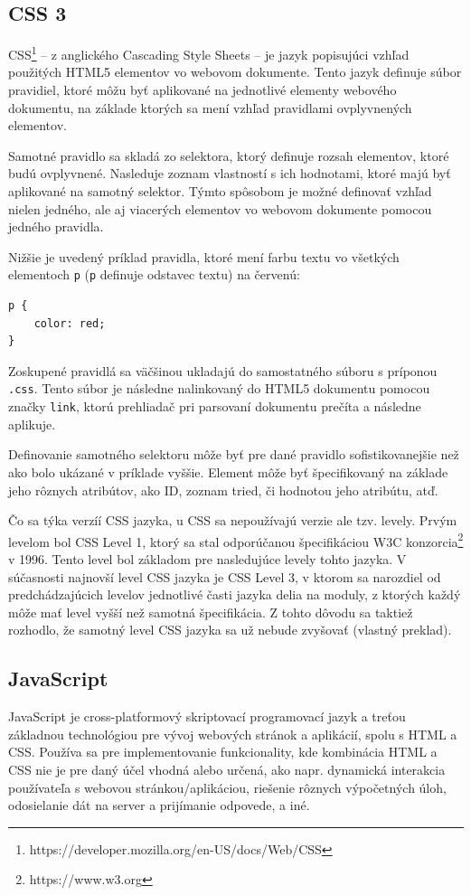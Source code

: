 \subsection {CSS 3}
CSS\footnote{https://developer.mozilla.org/en-US/docs/Web/CSS} -- z anglického Cascading Style Sheets -- je jazyk popisujúci vzhľad použitých HTML5 elementov vo webovom dokumente. Tento jazyk definuje súbor pravidiel, ktoré môžu byť aplikované na jednotlivé elementy webového dokumentu, na základe ktorých sa mení vzhľad pravidlami ovplyvnených elementov.

Samotné pravidlo sa skladá zo selektora, ktorý definuje rozsah elementov, ktoré budú ovplyvnené. Nasleduje zoznam vlastností s ich hodnotami, ktoré majú byť aplikované na samotný selektor. Týmto spôsobom je možné definovať vzhľad nielen jedného, ale aj viacerých elementov vo webovom dokumente pomocou jedného pravidla.

Nižšie je uvedený príklad pravidla, ktoré mení farbu textu vo všetkých elementoch \texttt{p} (\texttt{p} definuje odstavec textu) na červenú:

\begin{verbatim}
p {
    color: red;
}
\end{verbatim}

Zoskupené pravidlá sa väčšinou ukladajú do samostatného súboru s príponou \texttt{.css}. Tento súbor je následne nalinkovaný do HTML5 dokumentu pomocou značky \texttt{link}, ktorú prehliadač pri parsovaní dokumentu prečíta a následne aplikuje.

Definovanie samotného selektoru môže byť pre dané pravidlo sofistikovanejšie než ako bolo ukázané v príklade vyššie. Element môže byť špecifikovaný na základe jeho rôznych atribútov, ako ID, zoznam tried, či hodnotou jeho atribútu, atď.

Čo sa týka verzíí CSS jazyka, u CSS sa nepoužívajú verzie ale tzv. levely. Prvým levelom bol CSS Level 1, ktorý sa stal odporúčanou špecifikáciou W3C konzorcia\footnote{https://www.w3.org} v 1996. Tento level bol základom pre nasledujúce levely tohto jazyka. V súčasnosti najnovší level CSS jazyka je CSS Level 3, v ktorom sa narozdiel od predchádzajúcich levelov jednotlivé časti jazyka delia na moduly, z ktorých každý môže mať level vyšší než samotná špecifikácia. Z tohto dôvodu sa taktiež rozhodlo, že samotný level CSS jazyka sa už nebude zvyšovať \cite{about_css} (vlastný preklad).

\subsection {JavaScript}
JavaScript je cross-platformový skriptovací programovací jazyk a treťou základnou technológiou pre vývoj webových stránok a aplikácií, spolu s HTML a CSS. Používa sa pre implementovanie funkcionality, kde kombinácia HTML a CSS nie je pre daný účel vhodná alebo určená, ako napr. dynamická interakcia používateľa s webovou stránkou/aplikáciou, riešenie rôznych výpočetných úloh, odosielanie dát na server a prijímanie odpovede, a iné.

